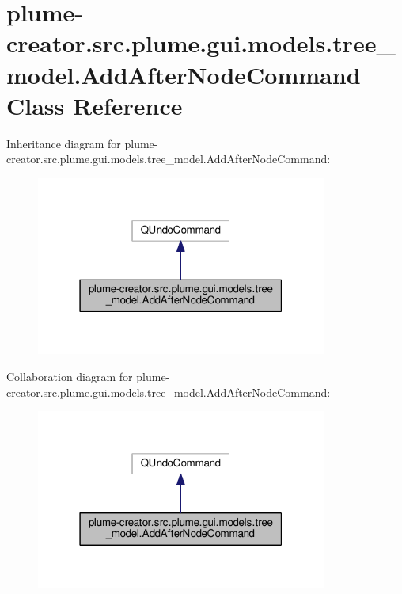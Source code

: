 \hypertarget{classplume-creator_1_1src_1_1plume_1_1gui_1_1models_1_1tree__model_1_1_add_after_node_command}{}\section{plume-\/creator.src.\+plume.\+gui.\+models.\+tree\+\_\+model.\+Add\+After\+Node\+Command Class Reference}
\label{classplume-creator_1_1src_1_1plume_1_1gui_1_1models_1_1tree__model_1_1_add_after_node_command}


Inheritance diagram for plume-\/creator.src.\+plume.\+gui.\+models.\+tree\+\_\+model.\+Add\+After\+Node\+Command\+:\nopagebreak
\begin{figure}[H]
\begin{center}
\leavevmode
\includegraphics[width=271pt]{classplume-creator_1_1src_1_1plume_1_1gui_1_1models_1_1tree__model_1_1_add_after_node_command__inherit__graph}
\end{center}
\end{figure}


Collaboration diagram for plume-\/creator.src.\+plume.\+gui.\+models.\+tree\+\_\+model.\+Add\+After\+Node\+Command\+:\nopagebreak
\begin{figure}[H]
\begin{center}
\leavevmode
\includegraphics[width=271pt]{classplume-creator_1_1src_1_1plume_1_1gui_1_1models_1_1tree__model_1_1_add_after_node_command__coll__graph}
\end{center}
\end{figure}
